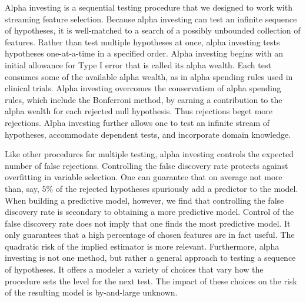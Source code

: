 \documentclass[12pt]{article}
\begin{document}
 Alpha investing \citep{fosterstine08} is a sequential testing procedure that we
 designed to work with streaming feature selection.  Because alpha investing can
 test an infinite sequence of hypotheses, it is well-matched to a search of a
 possibly unbounded collection of features.  Rather than test multiple
 hypotheses at once, alpha investing tests hypotheses one-at-a-time in a
 specified order.  Alpha investing begins with an initial allowance for Type I
 error that is called its alpha wealth.  Each test consumes some of the
 available alpha wealth, as in alpha spending rules used in clinical trials.
  Alpha investing overcomes the conservatism of alpha spending rules, which
 include the Bonferroni method, by earning a contribution to the alpha wealth
 for each rejected null hypothesis.  Thus rejections beget more rejections.
  Alpha investing further allows one to test an infinite stream of hypotheses,
 accommodate dependent tests, and incorporate domain knowledge.
 

 Like other procedures for multiple testing, alpha investing controls the expected number
 of false rejections.  Controlling the false discovery rate protects against overfitting
 in variable selection.  One can guarantee that on average not more than, say, 5\% of the
 rejected hypotheses spuriously add a predictor to the model.  When building a predictive
 model, however, we find that controlling the false discovery rate is secondary to
 obtaining a more predictive model.  Control of the false discovery rate does not imply
 that one finds the most predictive model.  It only guarantees that a high percentage of
 chosen features are in fact useful.  The quadratic risk of the implied estimator is more
 relevant.  Furthermore, alpha investing is not one method, but rather a general approach
 to testing a sequence of hypotheses.  It offers a modeler a variety of choices that vary
 how the procedure sets the level for the next test. The impact of these choices on the
 risk of the resulting model is by-and-large unknown.
\end{document}
